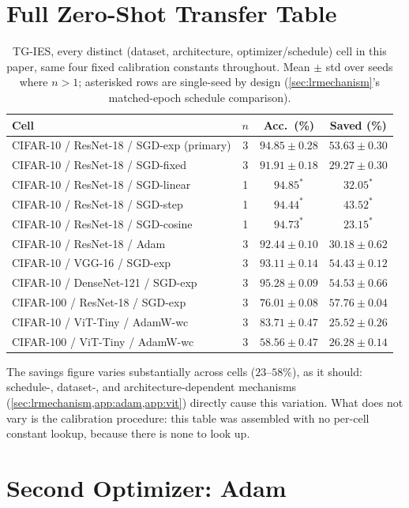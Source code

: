 \documentclass{article}
\theoremstyle{plain}
\theoremstyle{definition}
\theoremstyle{remark}
\begin{document}
\section{Full Zero-Shot Transfer Table}
\label{app:zeroshot}

\begin{table}[h]
\caption{TG-IES, every distinct (dataset, architecture, optimizer/schedule) cell in this paper, same four fixed calibration constants throughout. Mean $\pm$ std over seeds where $n{>}1$; asterisked rows are single-seed by design (\cref{sec:lrmechanism}'s matched-epoch schedule comparison).}
\label{tab:zeroshot}
\centering
\small
\begin{tabular}{lccc}
\toprule
Cell & $n$ & Acc.\ (\%) & Saved (\%) \\
\midrule
CIFAR-10 / ResNet-18 / SGD-exp (primary) & 3 & $94.85\pm0.28$ & $53.63\pm0.30$ \\
CIFAR-10 / ResNet-18 / SGD-fixed & 3 & $91.91\pm0.18$ & $29.27\pm0.30$ \\
CIFAR-10 / ResNet-18 / SGD-linear & 1 & $94.85^*$ & $32.05^*$ \\
CIFAR-10 / ResNet-18 / SGD-step & 1 & $94.44^*$ & $43.52^*$ \\
CIFAR-10 / ResNet-18 / SGD-cosine & 1 & $94.73^*$ & $23.15^*$ \\
CIFAR-10 / ResNet-18 / Adam & 3 & $92.44\pm0.10$ & $30.18\pm0.62$ \\
CIFAR-10 / VGG-16 / SGD-exp & 3 & $93.11\pm0.14$ & $54.43\pm0.12$ \\
CIFAR-10 / DenseNet-121 / SGD-exp & 3 & $95.28\pm0.09$ & $54.53\pm0.66$ \\
CIFAR-100 / ResNet-18 / SGD-exp & 3 & $76.01\pm0.08$ & $57.76\pm0.04$ \\
CIFAR-10 / ViT-Tiny / AdamW-wc & 3 & $83.71\pm0.47$ & $25.52\pm0.26$ \\
CIFAR-100 / ViT-Tiny / AdamW-wc & 3 & $58.56\pm0.47$ & $26.28\pm0.14$ \\
\bottomrule
\end{tabular}
\end{table}

The savings figure varies substantially across cells ($23$--$58\%$), as it should: schedule-, dataset-, and architecture-dependent mechanisms (\cref{sec:lrmechanism,app:adam,app:vit}) directly cause this variation. What does not vary is the calibration procedure: this table was assembled with no per-cell constant lookup, because there is none to look up.

\section{Second Optimizer: Adam}
\label{app:adam}
\end{document}
